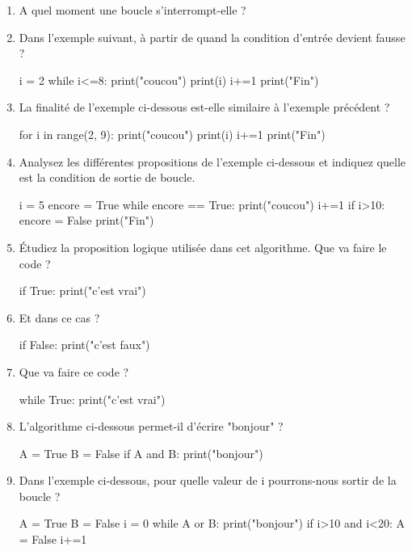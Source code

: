\begin{enumerate}
  \item A quel moment une boucle s'interrompt-elle ?
  \item Dans l’exemple suivant, à partir de quand la condition d'entrée devient fausse ?

\begin{python}
i = 2
while i<=8:
  print("coucou")
  print(i)
  i+=1
print("Fin")
\end{python}

  \item La finalité de l'exemple ci-dessous est-elle similaire à l'exemple précédent ?
\begin{python}
for i in range(2, 9):
  print("coucou")
  print(i)
  i+=1
print("Fin")
\end{python}
  \item Analysez les différentes propositions de l'exemple ci-dessous et indiquez quelle est la condition de sortie de boucle.
\begin{python}
i = 5
encore = True
while encore == True:
  print("coucou")
  i+=1
  if i>10:
    encore = False
print("Fin")
\end{python}

  \item Étudiez la proposition logique utilisée dans cet algorithme. Que va faire le code ?

\begin{python}
if True:
  print("c'est vrai")
\end{python}

  \item Et dans ce cas ?
\begin{python}
if False:
  print("c'est faux")
\end{python}

  \item Que va faire ce code ?
\begin{python}
while True:
  print("c'est vrai")
\end{python}

  \item L'algorithme ci-dessous permet-il d'écrire "bonjour" ?
\begin{python}
A = True
B = False
if A and B:
  print("bonjour")
\end{python}
  \item Dans l'exemple ci-dessous, pour quelle valeur de i pourrons-nous sortir de la boucle ?
\begin{python}
A = True
B = False
i = 0
while A or B:
  print("bonjour")
  if i>10 and i<20:
    A = False
  i+=1 
\end{python}


\end{enumerate}
